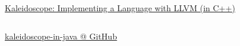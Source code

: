 \begin{frame}{}
	\begin{center}
		\href{https://llvm.org/docs/tutorial/}{Kaleidoscope: Implementing a Language with LLVM (in C++)}
	\end{center}

	\begin{columns}
	\end{columns}

	\vspace{0.20cm}
	\begin{center}
		\href{https://github.com/courses-at-nju-by-hfwei/kaleidoscope-in-java}{kaleidoscope-in-java @ GitHub}
	\end{center}
\end{frame}

